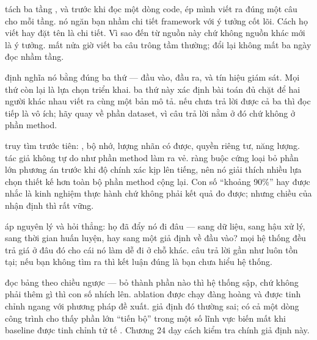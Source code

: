 \documentclass[../../deep_learning.tex]{subfiles}
\begin{document}
\begin{mach}
\item {} \gp tách ba tầng  \ra {} \ra {}, và trước khi đọc một dòng code, ép mình viết ra đúng một câu cho mỗi tầng. \hq nó ngăn bạn nhầm chi tiết framework với ý tưởng cốt lõi. Cách họ viết  hay đặt tên  là chi tiết. Vì sao  đến từ nguồn này chứ không nguồn khác mới là ý tưởng. \gia mất nửa giờ viết ba câu trông tầm thường; đổi lại không mất ba ngày đọc nhầm tầng.
\item {} \gp định nghĩa nó bằng đúng ba thứ --- đầu vào, đầu ra, và tín hiệu giám sát. Mọi thứ còn lại là lựa chọn triển khai. \gd ba thứ này xác định bài toán đủ chặt để hai người khác nhau viết ra cùng một bản mô tả. \hq nếu chưa trả lời được cả ba thì đọc tiếp là vô ích; hãy quay về phần dataset, vì câu trả lời nằm ở đó chứ không ở phần method.
\item {} \gp truy tìm  trước tiên: , bộ nhớ, lượng nhãn có được, quyền riêng tư, năng lượng. \gd tác giả không tự do như phần method làm ra vẻ. \hq ràng buộc cứng loại bỏ phần lớn phương án trước khi độ chính xác kịp lên tiếng, nên nó giải thích nhiều lựa chọn thiết kế hơn toàn bộ phần method cộng lại. Con số ``khoảng 90\%'' hay được nhắc là kinh nghiệm thực hành chứ không phải kết quả đo được; nhưng chiều của nhận định thì rất vững.
\item {} \gp áp nguyên lý  và hỏi thẳng: họ đã đẩy nó đi đâu --- sang dữ liệu, sang hậu xử lý, sang thời gian huấn luyện, hay sang một giả định về đầu vào? \gd mọi hệ thống đều trả giá ở đâu đó cho cái nó làm dễ đi ở chỗ khác. \hq câu trả lời gần như luôn tồn tại; nếu bạn không tìm ra thì kết luận đúng là bạn chưa hiểu hệ thống.
\item {} \gp đọc bảng  theo chiều ngược --- bỏ thành phần nào thì hệ thống sập, chứ không phải thêm gì thì con số nhích lên. \gd ablation được chạy đàng hoàng và  được tinh chỉnh ngang với phương pháp đề xuất. \vdm giả định đó thường sai; có cả một dòng công trình cho thấy phần lớn ``tiến bộ'' trong một số lĩnh vực biến mất khi baseline được tinh chỉnh tử tế \cite{dacrema2019worrying,musgrave2020metric}. Chương 24 dạy cách kiểm tra chính giả định này. 

\end{mach}
\end{document}
